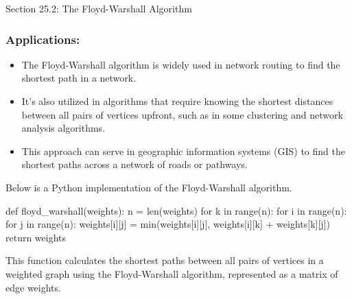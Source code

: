 \begin{notes}{Section 25.2: The Floyd-Warshall Algorithm}
    \subsubsection*{Applications:}
    
    \begin{itemize}
        \item The Floyd-Warshall algorithm is widely used in network routing to find the shortest path in a network.
        \item It's also utilized in algorithms that require knowing the shortest distances between all pairs of vertices upfront, such as in some clustering and network analysis algorithms.
        \item This approach can serve in geographic information systems (GIS) to find the shortest paths across a network of roads or pathways.
    \end{itemize}
    
    \begin{highlight}
    
    Below is a Python implementation of the Floyd-Warshall algorithm.
    
    \begin{code}[Python]
    def floyd_warshall(weights):
        n = len(weights)
        for k in range(n):
            for i in range(n):
                for j in range(n):
                    weights[i][j] = min(weights[i][j], weights[i][k] + weights[k][j])
        return weights
    \end{code}
    This function calculates the shortest paths between all pairs of vertices in a weighted graph using the Floyd-Warshall algorithm, represented as a matrix of edge weights.
    \end{highlight}    
\end{notes}